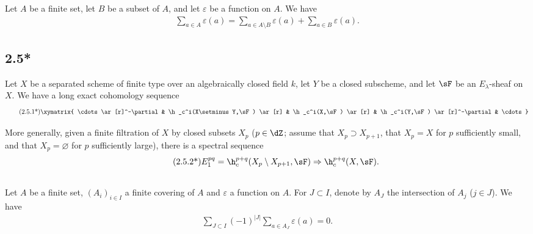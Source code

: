 Let $A$ be a finite set, let $B$ be a subset of $A$, and let $\varepsilon$ be a 
function on $A$. We have 
\begin{align*}\tag{2.5.1}\label{VI:2-5-1}
  \sum_{a\in A} \varepsilon(a) = \sum_{a\in A\setminus B}\varepsilon(a) + \sum_{a\in B} \varepsilon(a) \text{.}
\end{align*}





\subsection*{2.5*}\label{VI:2-5*}

Let $X$ be a separated scheme of finite type over an algebraically closed field $k$, 
let $Y$ be a closed subscheme, and let $\sF$ be an $E_\lambda$-sheaf on $X$. We have 
a long exact cohomology sequence 
\begin{align*}\tag{2.5.1*}\label{VI:eq:2-5-1*}
\xymatrix{
  \cdots \ar[r]^-\partial 
    & \h_c^i(X\setminus Y,\sF) \ar[r] 
    & \h_c^i(X,\sF) \ar[r] 
    & \h_c^i(Y,\sF) \ar[r]^-\partial 
    & \cdots 
}
\end{align*}

More generally, given a finite filtration of $X$ by closed subsets 
$X_p$ ($p\in \dZ$; assume that $X_p\supset X_{p+1}$, that $X_p=X$ 
for $p$ sufficiently small, and that $X_p=\varnothing$ for $p$ sufficiently large), there is a 
spectral sequence 
\begin{align*}\tag{2.5.2*}\label{VI:eq:2-5-2*}
  E_1^{p q} = \h_c^{p+q}(X_p\setminus X_{p+1},\sF) \Rightarrow \h_c^{p+q}(X,\sF) \text{.}
\end{align*}





\subsection{}\label{VI:2-6}

Let $A$ be a finite set, $(A_i)_{i\in I}$ a finite covering of $A$ and 
$\varepsilon$ a function on $A$. For $J\subset I$, denote by $A_J$ 
the intersection of $A_j$ ($j\in J$). We have 
\begin{align*}\tag{2.6.1}\label{VI:eq:2-6-1}
  \sum_{J\subset I} (-1)^{|J|} \sum_{a\in A_J} \varepsilon(a) = 0 \text{.}
\end{align*}





